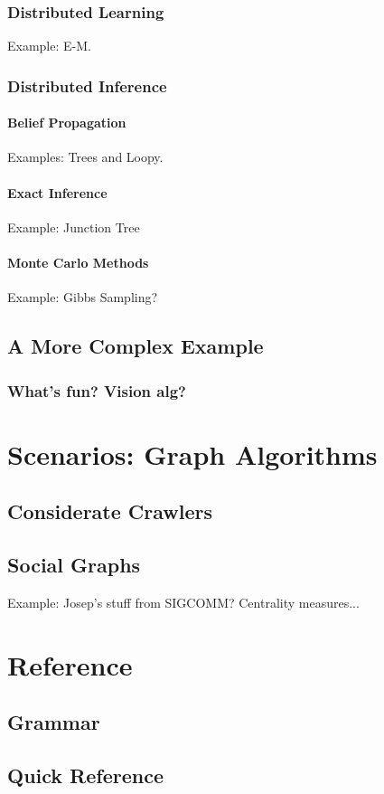 \documentclass[]{book}
\begin{document}
        \subsection{Distributed Learning}
        Example: E-M.
        \subsection{Distributed Inference}
            \subsubsection{Belief Propagation}
            Examples: Trees and Loopy.
            \subsubsection{Exact Inference}
            Example: Junction Tree
            \subsubsection{Monte Carlo Methods}
            Example: Gibbs Sampling?
    \section{A More Complex Example}
        \subsection{What's fun?  Vision alg?}

\chapter{Scenarios: Graph Algorithms}
    \section{Considerate Crawlers}
    \section{Social Graphs}
    Example: Josep's stuff from SIGCOMM?  Centrality measures...
 
\chapter{Reference}
    \section{Grammar}
    \section{Quick Reference}
\end{document}
